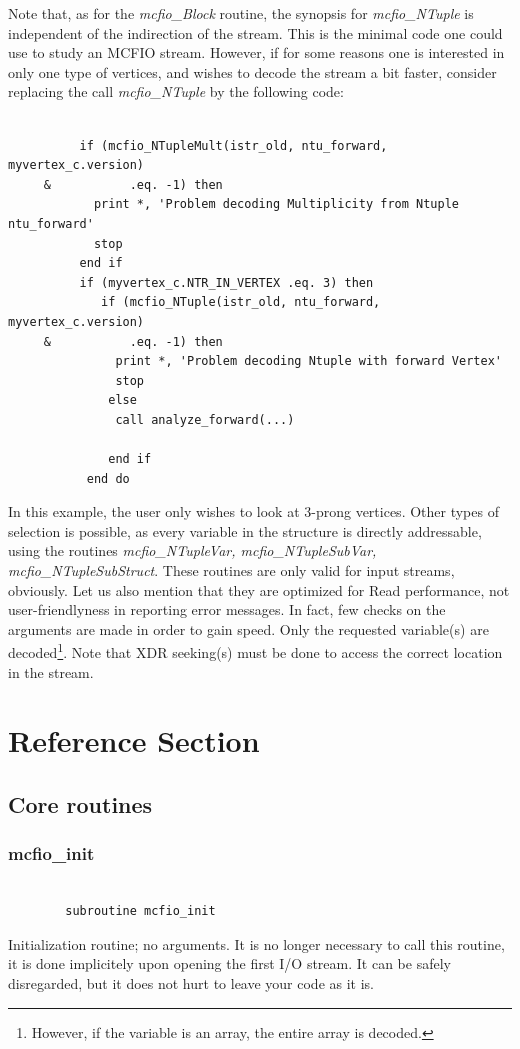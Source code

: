 	Note that, as for the {\em mcfio\_Block} routine, the synopsis for
{\em mcfio\_NTuple} is independent of the indirection of the stream. This is
the minimal code one could use to study an MCFIO stream.  However, if for some
reasons one is interested in only one type of vertices, and wishes to decode
the stream a bit faster, consider replacing the call {\em mcfio\_NTuple}
by the following code:

\begin{verbatim}

          if (mcfio_NTupleMult(istr_old, ntu_forward, myvertex_c.version)
     &           .eq. -1) then
            print *, 'Problem decoding Multiplicity from Ntuple ntu_forward'
            stop
          end if
          if (myvertex_c.NTR_IN_VERTEX .eq. 3) then
             if (mcfio_NTuple(istr_old, ntu_forward, myvertex_c.version)
     &           .eq. -1) then
               print *, 'Problem decoding Ntuple with forward Vertex'
               stop
              else
               call analyze_forward(...)

              end if
           end do

\end{verbatim}

In this example, the user only wishes to look at 3-prong vertices.  Other types
of selection is possible, as every variable in the structure is  directly
addressable, using the routines {\em mcfio\_NTupleVar,   mcfio\_NTupleSubVar,
mcfio\_NTupleSubStruct}.  These routines are only valid for input streams,
obviously. Let us also mention that they are optimized for  Read performance,
not user-friendlyness in reporting error messages.  In fact, few checks on the
arguments are made in order to gain speed. Only the  requested variable(s) are
decoded\footnote{However, if the variable is an  array, the entire array is
decoded.}.  Note that XDR seeking(s) must be done to access the correct
location in the stream.




\section{Reference Section}

\subsection{Core routines}


\subsubsection{mcfio\_init}
\begin{verbatim}

        subroutine mcfio_init

\end{verbatim}
 Initialization routine; no arguments. It is no longer necessary to call
 this routine, it is done implicitely upon opening the first I/O stream.
 It can be safely disregarded, but it does not hurt to leave your code as
 it is.

